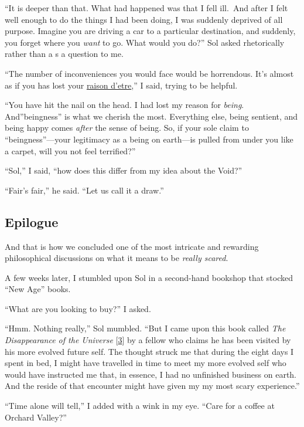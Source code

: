 \documentclass[
  a4paper,
]{article}
\begin{document}
``It is deeper than that. What had happened was that I fell ill.~And
after I felt well enough to do the things I had been doing, I was
suddenly deprived of all purpose. Imagine you are driving a car to a
particular destination, and suddenly, you forget where you \emph{want}
to go. What would you do?'' Sol asked rhetorically rather than a s a
question to me.

``The number of inconveniences you would face would be horrendous. It's
almost as if you has lost your
\href{https://www.vocabulary.com/dictionary/raison\%20d\%27etre}{raison
d'etre},'' I said, trying to be helpful.

``You have hit the nail on the head. I had lost my reason for
\emph{being}. And''beingness'' is what we cherish the most. Everything
else, being sentient, and being happy comes \emph{after} the sense of
being. So, if your sole claim to ``beingness''---your legitimacy as a
being on earth---is pulled from under you like a carpet, will you not
feel terrified?''

``Sol,'' I said, ``how does this differ from my idea about the Void?''

``Fair's fair,'' he said. ``Let us call it a draw.''

\hypertarget{epilogue}{%
\subsection{Epilogue}\label{epilogue}}

And that is how we concluded one of the most intricate and rewarding
philosophical discussions on what it means to be \emph{really scared}.

A few weeks later, I stumbled upon Sol in a second-hand bookshop that
stocked ``New Age'' books.

``What are you looking to buy?'' I asked.

``Hmm. Nothing really,'' Sol mumbled. ``But I came upon this book called
\emph{The Disappearance of the Universe}
{[}\protect\hyperlink{ref-renard2004}{3}{]} by a fellow who claims he
has been visited by his more evolved future self. The thought struck me
that during the eight days I spent in bed, I might have travelled in
time to meet my more evolved self who would have instructed me that, in
essence, I had no unfinished business on earth. And the reside of that
encounter might have given my my most scary experience.''

``Time alone will tell,'' I added with a wink in my eye. ``Care for a
coffee at Orchard Valley?''
\end{document}
